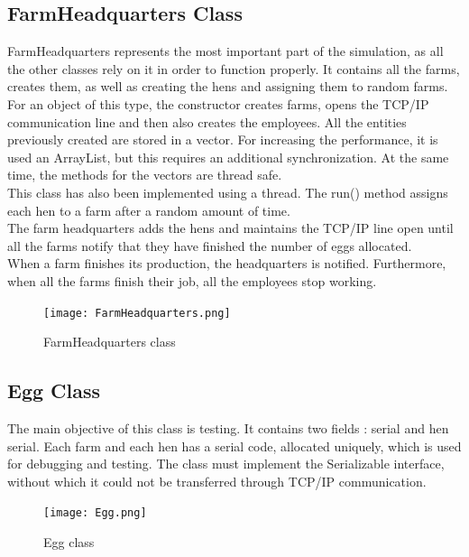 \documentclass{article}
\begin{document}
\subsection{FarmHeadquarters Class}
FarmHeadquarters represents the most important part of the simulation, as all the other classes rely on it in order to function properly. It contains all the farms, creates them, as well as creating the hens and assigning them to random farms. \\
For an object of this type, the constructor creates farms, opens the TCP/IP communication line and then also  creates the employees. All the entities previously created are stored in a vector. For increasing the performance, it is used an ArrayList, but this requires an additional synchronization. At the same time, the methods for the vectors are thread safe.
 \\
 This class has also been implemented using a thread. The run() method assigns each hen to a farm after a random amount of time.
 \\
 The farm headquarters adds the hens and maintains the TCP/IP line open until all the farms notify that they have finished the number of eggs allocated.
\\
When a farm finishes its production, the headquarters is notified. Furthermore, when all the farms finish their job, all the employees stop working.
\\

 \begin{figure}[htp]
    \centering
    \texttt{[image: FarmHeadquarters.png]}
    \caption{FarmHeadquarters class}
\end{figure}

\subsection{ Egg Class}
The main objective of this class is testing. It contains two fields : serial and hen serial. Each farm and each hen has a serial code, allocated uniquely, which is used for debugging and testing. The class must implement the Serializable interface, without which it could not be transferred through TCP/IP communication.
\\

\begin{figure}[htp]
    \centering
    \texttt{[image: Egg.png]}
    \caption{Egg class}
\end{figure}
\end{document}

